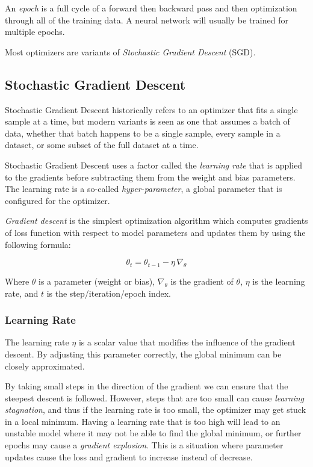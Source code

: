 \documentclass[a4paper]{article}
\begin{document}
An \emph{epoch} is a full cycle of a forward then backward pass and then optimization through all of the training data. A neural network will usually be trained for multiple epochs.

Most optimizers are variants of \emph{Stochastic Gradient Descent} (SGD).

\subsection*{Stochastic Gradient Descent}
Stochastic Gradient Descent historically refers to an optimizer that fits a single sample at a time, but modern variants is seen as one that assumes a batch of data, whether that batch happens to be a single sample, every sample in a dataset, or some subset of the full dataset at a time.

Stochastic Gradient Descent uses a factor called the \emph{learning rate} that is applied to the gradients before subtracting them from the weight and bias parameters. The learning rate is a so-called \emph{hyper-parameter}, a global parameter that is configured for the optimizer.

\emph{Gradient descent} is the simplest optimization algorithm which computes gradients of loss function with respect to model parameters and updates them by using the following formula:

\begin{equation*}
    \theta_t = \theta_{t-1} - \eta \, \nabla_\theta
\end{equation*}

Where $\theta$ is a parameter (weight or bias), $\nabla_\theta$ is the gradient of $\theta$, $\eta$ is the learning rate, and $t$ is the step/iteration/epoch index. 

\subsubsection*{Learning Rate}
The learning rate $\eta$ is a scalar value that modifies the influence of the gradient descent. By adjusting this parameter correctly, the global minimum can be closely approximated. 

By taking small steps in the direction of the gradient we can ensure that the steepest descent is followed. However, steps that are too small can cause \emph{learning stagnation}, and thus if the learning rate is too small, the optimizer may get stuck in a local minimum. Having a learning rate that is too high will lead to an unstable model where it may not be able to find the global minimum, or further epochs may cause a \emph{gradient explosion}. This is a situation where parameter updates cause the loss and gradient to increase instead of decrease.
\end{document}
